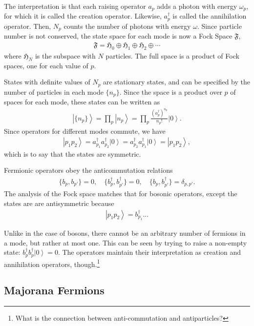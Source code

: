 \documentclass[12pt]{article} %
\newcommand{\om}{\omega}
\newcommand{\ket}[1]{\left|#1\right\rangle}
\begin{document}
The interpretation is that each raising operator $a_p$ adds a photon with energy $\om_p$, for which it is called the creation operator. Likewise, $a_p^\dag$ is called the annihilation operator. Then, $N_p$ counts the number of photons with energy $\om$. Since particle number is not conserved, the state space for each mode is now a  Fock Space $\mathfrak{F}$,
\begin{align}
\mathfrak{F} = \mathfrak{H}_0 \oplus \mathfrak{H}_1 \oplus \mathfrak{H}_2 
\oplus \cdots
\end{align}
where $\mathfrak{H}_N$ is the subspace with $N$ particles. The full space is a product of Fock spaces, one for each value of $p$.

States with definite values of $N_p$ are stationary states, and can be specified by the number of particles in each mode $\{n_p\}$. Since the space is a product over $p$ of spaces for each mode, these states can be written as
\begin{align}
\ket{\{n_p\}} = \prod_p\ket{n_p} = \prod_p\frac{(a_p^\dag)^{n_p}}{n_p!}\ket{0}.
\end{align}
Since operators for different modes commute, we have
\begin{align}
\ket{p_1p_2} = a^\dag_{p_1}a^\dag_{p_2}\ket{0} = a^\dag_{p_2} a^\dag_{p_1} \ket{0} = \ket{p_1p_2},
\end{align}
which is to say that the states are symmetric.

Fermionic operators obey the anticommutation relations
\begin{align}
\{b_p, b_{p'}\} = 0,\quad \{b^\dag_p, b^\dag_{p'}\} = 0,\quad \{b_p, b^\dag_{p'}\} = \delta_{p,p'}.
\end{align}
The analysis of the Fock space matches that for bosonic operators, except the states are are antisymmetric because
\begin{align}
\ket{p_1p_2} = b^\dag_{p_1}...
\end{align}

Unlike in the case of bosons, there cannot be an arbitrary number of fermions in a mode, but rather at most one. This can be seen by trying to raise a non-empty state: $b_p^\dag b^\dag_p\ket{0} = 0$. The operators maintain their interpretation as creation and annihilation operators, though.\footnote{What is the connection between anti-commutation and antiparticles?}

\subsection{Majorana Fermions} \emph{}
\end{document}
